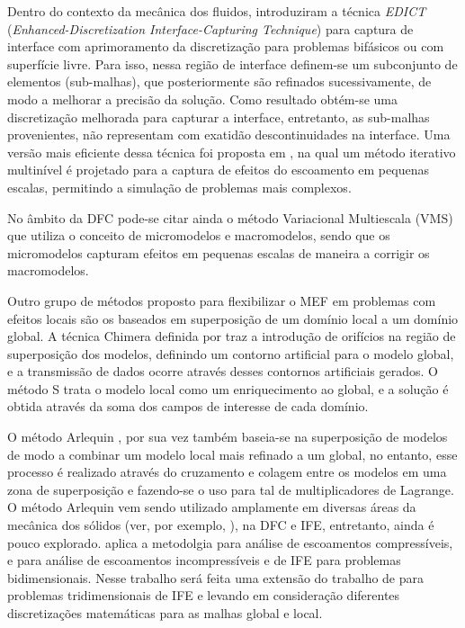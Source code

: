 \documentclass[tese_patricia.tex]{subfiles}
\begin{document}
Dentro do contexto da mecânica dos fluidos,  introduziram a técnica \textit{EDICT} (\textit{Enhanced-Discretization Interface-Capturing Technique}) para captura de interface com aprimoramento da discretização para problemas bifásicos ou com superfície livre. Para isso, nessa região de interface definem-se um subconjunto de elementos (sub-malhas), que posteriormente são refinados sucessivamente, de modo a melhorar a precisão da solução. Como resultado obtém-se uma discretização melhorada para capturar a interface, entretanto, as sub-malhas provenientes, não representam com exatidão descontinuidades na interface. Uma versão mais eficiente dessa técnica foi proposta em , na qual um método iterativo multinível é projetado para a captura de efeitos do escoamento em pequenas escalas, permitindo a simulação de problemas mais complexos.

No âmbito da DFC pode-se citar ainda o método Variacional Multiescala (VMS) \cite{Hughesetal:1998} que utiliza o conceito de micromodelos e macromodelos, sendo que os micromodelos capturam efeitos em pequenas escalas de maneira a corrigir os macromodelos.

Outro grupo de métodos proposto para flexibilizar o MEF em problemas com efeitos locais são os baseados em superposição de um domínio local a um domínio global. A técnica Chimera definida por  traz a introdução de orifícios na região de superposição dos modelos, definindo um contorno artificial para o modelo global, e a transmissão de dados ocorre através desses contornos artificiais gerados. O método S \cite{Fish:1992} trata o modelo local como um enriquecimento ao global, e a solução é obtida através da soma dos campos de interesse de cada domínio.

O método Arlequin \cite{Dhia:1998,DhiaR:2001}, por sua vez também baseia-se na superposição de modelos de modo a combinar um modelo local mais refinado a um global, no entanto, esse processo é realizado através do cruzamento e colagem entre os modelos em uma zona de superposição e fazendo-se o uso para tal de multiplicadores de Lagrange.  O método Arlequin vem sendo utilizado amplamente em diversas áreas da mecânica dos sólidos (ver, por exemplo, ), na DFC e IFE, entretanto, ainda é pouco explorado.  aplica a metodolgia para análise de escoamentos compressíveis, e  para análise de escoamentos incompressíveis e de IFE para problemas bidimensionais. Nesse trabalho será feita uma extensão do trabalho de   para problemas tridimensionais de IFE e levando em consideração diferentes discretizações matemáticas para as malhas global e local.
\end{document}
